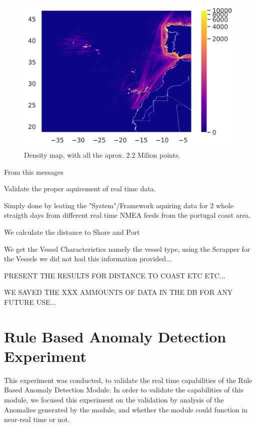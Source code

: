 \begin{figure}[H]
	\centering
	\includegraphics[scale = 1]{figures/Ch5/ThesisExpDensity.png}
    \caption{Density map, with all the aprox. $2.2$ Milion points.}
    \label{fig: 5 Exp1DensityMap}
\end{figure}

From this messages 

Validate the proper aquirement of real time data.

Simply done by leating the "System"/Framework aquiring data for 2 whole straigth days from different real time NMEA feeds from the portugal coast area.

We calculate the distance to Shore and Port

We get the Vessel Characteristics namely the vessel type, using the Scrapper for the Vessels we did not had this information provided...

PRESENT THE RESULTS FOR DISTANCE TO COAST ETC ETC...

WE SAVED THE XXX AMMOUNTS OF DATA IN THE DB FOR ANY FUTURE USE...


\section{Rule Based Anomaly Detection Experiment}
\label{section: Rule Based Anomaly Detection Experiment}

This experiment was conducted, to validate the real time capabilities of the Rule Based Anomaly Detection Module. In order to validate the capabilities of this module, we focused this experiment on the validation by analysis of the Anomalies generated by the module, and whether the module could function in near-real time or not.


